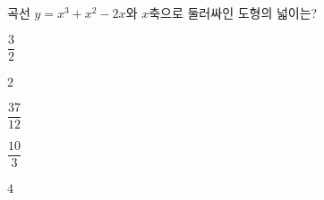 곡선 $y=x^3+x^2-2x$와 $x$축으로 둘러싸인 도형의 넓이는?
\begin{choices32}{\rule[-3ex]{0pt}{8ex}$\dfrac{3}{2}$}{\rule[-3ex]{0pt}{8ex}$2$}{\rule[-3ex]{0pt}{8ex}$\dfrac{37}{12}$}{\rule[-3ex]{0pt}{8ex}$\dfrac{10}{3}$}{\rule[-3ex]{0pt}{8ex}$4$}\end{choices32}
